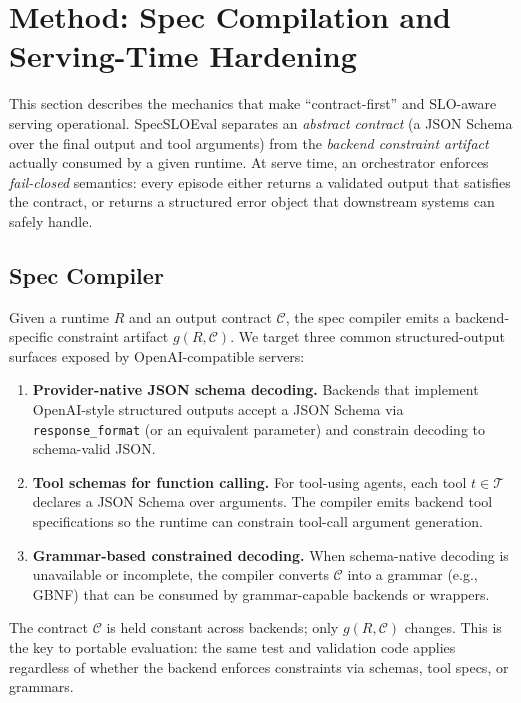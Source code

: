 \documentclass[11pt]{article}
\newcommand{\slo}{\ensuremath{\mathrm{SLO}}}
\begin{document}
\section{Method: Spec Compilation and Serving-Time Hardening}
\label{sec:method}

This section describes the mechanics that make ``contract-first'' and \slo-aware serving operational.
SpecSLOEval separates an \emph{abstract contract} (a JSON Schema over the final output and tool arguments) from the \emph{backend constraint artifact} actually consumed by a given runtime.
At serve time, an orchestrator enforces \emph{fail-closed} semantics: every episode either returns a validated output that satisfies the contract, or returns a structured error object that downstream systems can safely handle.

\subsection{Spec Compiler}
\label{sec:spec-compiler}

Given a runtime $R$ and an output contract $\mathcal{C}$, the spec compiler emits a backend-specific constraint artifact $g(R,\mathcal{C})$.
We target three common structured-output surfaces exposed by OpenAI-compatible servers:

\begin{enumerate}[leftmargin=12pt]
    \item \textbf{Provider-native JSON schema decoding.}
    Backends that implement OpenAI-style structured outputs accept a JSON Schema via \texttt{response\_format} (or an equivalent parameter) and constrain decoding to schema-valid JSON.
    \item \textbf{Tool schemas for function calling.}
    For tool-using agents, each tool $t\in\mathcal{T}$ declares a JSON Schema over arguments.
    The compiler emits backend tool specifications so the runtime can constrain tool-call argument generation.
    \item \textbf{Grammar-based constrained decoding.}
    When schema-native decoding is unavailable or incomplete, the compiler converts $\mathcal{C}$ into a grammar (e.g., GBNF) that can be consumed by grammar-capable backends or wrappers.
\end{enumerate}

The contract $\mathcal{C}$ is held constant across backends; only $g(R,\mathcal{C})$ changes.
This is the key to portable evaluation: the same test and validation code applies regardless of whether the backend enforces constraints via schemas, tool specs, or grammars.
\end{document}

